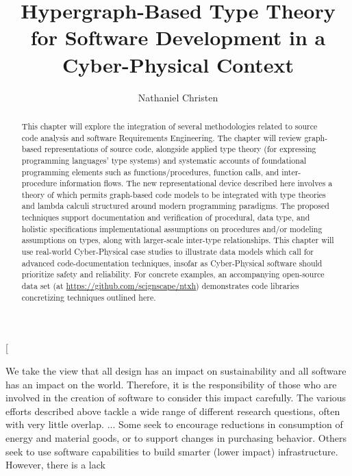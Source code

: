 \documentclass[11pt,twocolumn]{article}
\begin{document}
\title{Hypergraph-Based Type Theory 
for Software Development in a Cyber-Physical Context}
\author[1]{Nathaniel Christen}
\twocolumn[\begin{@twocolumnfalse}
\maketitle{}
\begin{abstract}This chapter will explore the integration of several methodologies 
related to source code analysis and software Requirements 
Engineering.  The chapter will review 
graph-based representations of source code, 
alongside applied type theory (for expressing 
programming languages' type systems) and 
systematic accounts of foundational programming 
elements such as functions/procedures, function calls, and 
inter-procedure information flows.  The new 
representational device described here involves a theory 
of  which permits  
graph-based code models to be integrated with type theories 
and lambda calculi structured around modern 
programming paradigms.   
The proposed techniques support documentation and 
verification of procedural, data type, and holistic 
specifications \mdash{} implementational assumptions on procedures  
and/or modeling assumptions on types, along with 
larger-scale inter-type relationships.  
This chapter will use real-world Cyber-Physical case studies 
to illustrate data models which call for advanced 
code-documentation techniques, insofar as Cyber-Physical 
software should prioritize safety and reliability.    
For concrete examples, an accompanying open-source data set (at
\url{https://github.com/scignscape/ntxh}) 
demonstrates code libraries concretizing 
techniques outlined here.
\end{abstract} 
\newsavebox{\qboxi}
\begin{lrbox}{\qboxi}
\begin{frquote}
{\sadded}We take the view that all design has an impact on
sustainability and all software has an impact on the world. 
Therefore, it is the responsibility of those who are involved in the creation of software to consider this impact carefully.  The various efforts described above tackle a wide range of different research questions,
often with very little overlap. ... {\eadded}
Some seek to encourage reductions in consumption of energy
and  material  goods,  or  to  support  changes  in  purchasing
behavior.  Others  seek  to  use  software  capabilities  to  build
smarter (lower impact) infrastructure. However, there is a lack

\end{frquote}
\end{lrbox}
\end{@twocolumnfalse}
\end{document}
